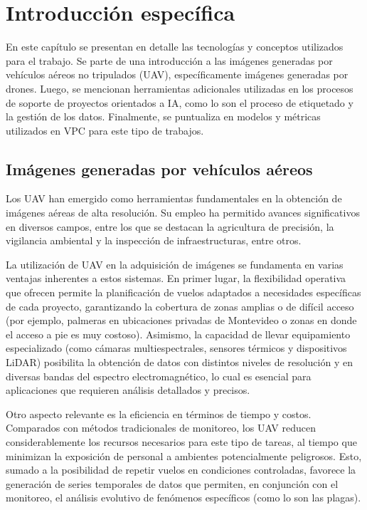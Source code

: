 \chapter{Introducción específica}
\label{Chapter2}

En este capítulo se presentan en detalle las tecnologías y conceptos utilizados para el trabajo. Se parte de una introducción a las imágenes generadas por vehículos aéreos no tripulados (UAV), específicamente imágenes generadas por drones. Luego, se mencionan herramientas adicionales utilizadas en los procesos de soporte de proyectos orientados a IA, como lo son el proceso de etiquetado y la gestión de los datos. Finalmente, se puntualiza en modelos y métricas utilizados en VPC para este tipo de trabajos.

\section{Imágenes generadas por vehículos aéreos}
\label{sec:imgUAV}

Los UAV han emergido como herramientas fundamentales en la obtención de imágenes aéreas de alta resolución. Su empleo ha permitido avances significativos en diversos campos, entre los que se destacan la agricultura de precisión, la vigilancia ambiental y la inspección de infraestructuras, entre otros.

La utilización de UAV en la adquisición de imágenes se fundamenta en varias ventajas inherentes a estos sistemas. En primer lugar, la flexibilidad operativa que ofrecen permite la planificación de vuelos adaptados a necesidades específicas de cada proyecto, garantizando la cobertura de zonas amplias o de difícil acceso (por ejemplo, palmeras en ubicaciones privadas de Montevideo o zonas en donde el acceso a pie es muy costoso). Asimismo, la capacidad de llevar equipamiento especializado (como cámaras multiespectrales, sensores térmicos y dispositivos LiDAR) posibilita la obtención de datos con distintos niveles de resolución y en diversas bandas del espectro electromagnético, lo cual es esencial para aplicaciones que requieren análisis detallados y precisos.

Otro aspecto relevante es la eficiencia en términos de tiempo y costos. Comparados con métodos tradicionales de monitoreo, los UAV reducen considerablemente los recursos necesarios para este tipo de tareas, al tiempo que minimizan la exposición de personal a ambientes potencialmente peligrosos. Esto, sumado a la posibilidad de repetir vuelos en condiciones controladas, favorece la generación de series temporales de datos que permiten, en conjunción con el monitoreo, el análisis evolutivo de fenómenos específicos (como lo son las plagas).

